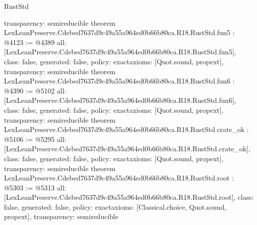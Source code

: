 \begin{lexlean}{RustStd}
\begin{coremodule}
{  transparency: semireducible
}
theorem LexLeanPreserve.Cdebed7637d9c49a55a964ed0b66b80ca.R18.RustStd.fun5 : @4123 := @4389 {
  all: [LexLeanPreserve.Cdebed7637d9c49a55a964ed0b66b80ca.R18.RustStd.fun5],
  class: false,
  generated: false,
  policy: exact{axioms: [Quot.sound, propext]},
  transparency: semireducible
}
theorem LexLeanPreserve.Cdebed7637d9c49a55a964ed0b66b80ca.R18.RustStd.fun6 : @4390 := @5102 {
  all: [LexLeanPreserve.Cdebed7637d9c49a55a964ed0b66b80ca.R18.RustStd.fun6],
  class: false,
  generated: false,
  policy: exact{axioms: [Quot.sound, propext]},
  transparency: semireducible
}
theorem LexLeanPreserve.Cdebed7637d9c49a55a964ed0b66b80ca.R18.RustStd.crate_ok : @5106 := @5295 {
  all: [LexLeanPreserve.Cdebed7637d9c49a55a964ed0b66b80ca.R18.RustStd.crate_ok],
  class: false,
  generated: false,
  policy: exact{axioms: [Quot.sound, propext]},
  transparency: semireducible
}
theorem LexLeanPreserve.Cdebed7637d9c49a55a964ed0b66b80ca.R18.RustStd.root : @5303 := @5313 {
  all: [LexLeanPreserve.Cdebed7637d9c49a55a964ed0b66b80ca.R18.RustStd.root],
  class: false,
  generated: false,
  policy: exact{axioms: [Classical.choice, Quot.sound, propext]},
  transparency: semireducible
}


\end{coremodule}
\end{lexlean}
